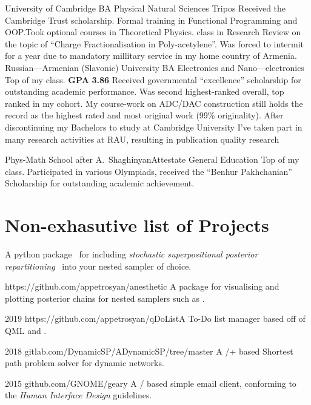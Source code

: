 \documentclass{CurriculumVitae}[10pt, draft, condensed]
\begin{document}
{  
  {University of Cambridge} {BA }{Physical Natural Sciences
    Tripos} {Received the Cambridge Trust scholarship. Formal training
    in Functional Programming and OOP.\@ Took optional courses in
    Theoretical Physics.  class in Research Review on the topic
    of ``Charge Fractionalisation in Poly-acetylene''. Was forced to
    intermit for a year due to mandatory millitary service in my home
    country of Armenia. }   {Russian---Armenian
    (Slavonic) University} {BA }{Electronics and
    Nano---electronics} {Top of my class. \textbf{GPA} \textbf{3.86}
    Received governmental ``excellence'' scholarship for outstanding
    academic performance. Was second highest-ranked overall, top
    ranked in my cohort. My course-work on ADC/DAC construction still
    holds the record as the highest rated and most original work (99\%
    originality). After discontinuing my Bachelors to study at
    Cambridge University I've taken part in many research activities
    at RAU, resulting in publication quality
    research~\cite{cu2o,measurement}}

   {Phys-Math School after
    A.~Shaghinyan}{Attestate }{General Education} {Top of my
    class. Participated in various Olympiads, received the ``Benhur
    Pakhchanian'' Scholarship for outstanding academic achievement. }

  \section*{Non-exhasutive list of Projects}%



   {A
    python package~\cite{sspr-maxent} for including \emph{stochastic
      superpositional posterior repartitioning}~\cite{sspr} into your
    nested sampler of choice.}

   {https://github.com/appetrosyan/anesthetic}
  {A package for visualising and plotting posterior chains for nested
    samplers such as .}

   {2019} {https://github.com/appetrosyan/qDoList}{A
    To-Do list manager based off of QML and .}

   {2018}
  {gitlab.com/DynamicSP/ADynamicSP/tree/master} {A
    /+ based Shortest path problem solver for
    dynamic networks. }

   {2015} {github.com/GNOME/geary} {A
    / based simple email client, conforming to the
     \emph{Human Interface Design} guidelines.}

  }
\end{document}
